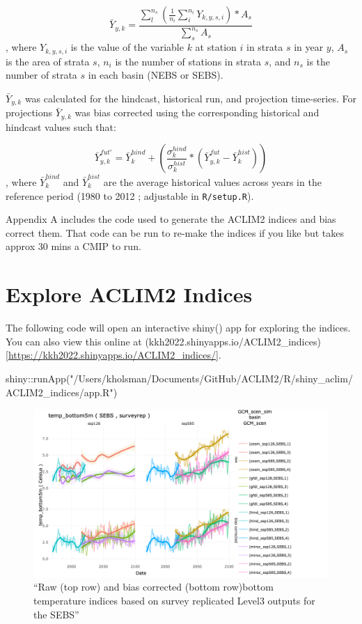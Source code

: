 \documentclass[
]{article}
\newenvironment{Shaded}{\begin{snugshade}}{\end{snugshade}}
\newcommand{\FunctionTok}[1]{\textcolor[rgb]{0.00,0.00,0.00}{#1}}
\newcommand{\NormalTok}[1]{#1}
\newcommand{\SpecialCharTok}[1]{\textcolor[rgb]{0.00,0.00,0.00}{#1}}
\newcommand{\StringTok}[1]{\textcolor[rgb]{0.31,0.60,0.02}{#1}}
\begin{document}
\[\bar{Y}_{y,k}= \frac{\sum^{n_s}_{l}(\frac{1}{n_i}\sum^{n_i}_{i}Y_{k,y,s,i})*A_s} {\sum^{n_s}_{s}{A_s}}\],
where \(Y_{k,y,s,i}\) is the value of the variable \(k\) at station
\(i\) in strata \(s\) in year \(y\), \(A_s\) is the area of strata
\(s\), \(n_i\) is the number of stations in strata \(s\), and \(n_s\) is
the number of strata \(s\) in each basin (NEBS or SEBS).

\(\bar{Y}_{y,k}\) was calculated for the hindcast, historical run, and
projection time-series. For projections \(\bar{Y}_{y,k}\) was bias
corrected using the corresponding historical and hindcast values such
that:

\[\bar{Y}^{fut'}_{y,k} =\bar{Y}^{hind}_{k} +\left( \frac{\sigma^{hind}_{k}}{\sigma^{hist}_{k}}*(\bar{Y}^{fut}_{y,k}-\bar{Y}^{hist}_{k})  \right )\],
where \(\bar{Y}^{hind}_{k}\) and \(\bar{Y}^{hist}_{k}\) are the average
historical values across years in the reference period (1980 to 2012 ;
adjustable in \texttt{R/setup.R}).

Appendix A includes the code used to generate the ACLIM2 indices and
bias correct them. That code can be run to re-make the indices if you
like but takes approx 30 mins a CMIP to run.

\hypertarget{explore-aclim2-indices}{%
\section{Explore ACLIM2 Indices}\label{explore-aclim2-indices}}

The following code will open an interactive shiny() app for exploring
the indices. You can also view this online at
(kkh2022.shinyapps.io/ACLIM2\_indices){[}\url{https://kkh2022.shinyapps.io/ACLIM2_indices/}{]}.

\begin{Shaded}
\begin{Highlighting}[]
\NormalTok{shiny}\SpecialCharTok{::}\FunctionTok{runApp}\NormalTok{(}\StringTok{"/Users/kholsman/Documents/GitHub/ACLIM2/R/shiny\_aclim/ACLIM2\_indices/app.R"}\NormalTok{)}
\end{Highlighting}
\end{Shaded}

\begin{figure}
\centering
\includegraphics[width=1\textwidth,height=\textheight]{Figs/biascorrected_temp2.png}
\caption{``Raw (top row) and bias corrected (bottom row)bottom
temperature indices based on survey replicated Level3 outputs for the
SEBS''}
\end{figure}
\end{document}
